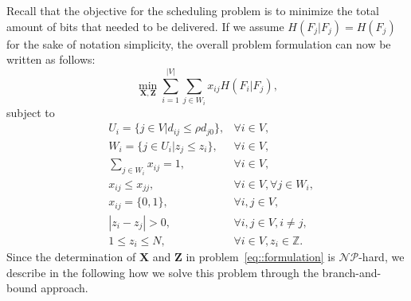 Recall that the objective for the scheduling problem is to minimize the total amount of bits that needed to be delivered.
If we assume $H(F_j|F_j) = H(F_j)$ for the sake of notation simplicity, the overall problem formulation can now be written as follows:
\begin{equation*}
\underset{\mathbf{X}, \mathbf{Z}}{\min}
\sum_{i=1}^{|V|} \sum_{j \in W_i}  x_{ij} H(F_i|F_j),
\end{equation*}
subject to
\begin{align}
&U_i = \{ j \in V | d_{ij} \leq \rho d_{j0} \}, &\forall i \in V, \nonumber \\
&W_i = \{ j \in U_i | z_j \leq z_i \}, &\forall i \in V, \nonumber \\
&\sum_{j \in W_i} x_{ij} = 1, &\forall i \in V, \nonumber \\
&x_{ij} \leq x_{jj}, &\forall i \in V, \forall j \in W_i, \nonumber \\
&x_{ij} = \{0,1\}, &\forall i,j \in V, \nonumber \\
&|z_i - z_j| > 0, &\forall i,j \in V, i \neq j, \nonumber \\
&1 \leq z_i \leq N, &\forall i \in V, z_i \in \mathbb{Z}.
\label{eq::formulation}
\end{align}
Since the determination of $\mathbf{X}$ and $\mathbf{Z}$ in problem~\eqref{eq::formulation} is $\mathcal{NP}$-hard, we describe in the following how we solve this problem through the branch-and-bound approach.
%
